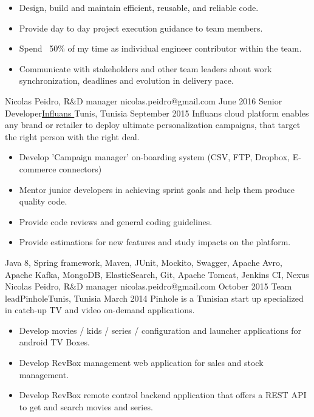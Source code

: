 \begin{experiences}
{\begin{itemize}
        \item Design, build and maintain efficient, reusable, and reliable code.
        \item Provide day to day project execution guidance to team members.
        \item Spend ~50\% of my time as individual engineer contributor within the team.
        \item Communicate with stakeholders and other team leaders about work synchronization, deadlines and evolution in delivery pace.
      \end{itemize}
    }
    {Nicolas Peidro, R\&D manager} {nicolas.peidro@gmail.com}
  \emptySeparator   
  \experienceWithReference
    {June 2016}       {Senior Developer}{\href{https://www.influans.com}{Influans \faExternalLink}}{Tunis, Tunisia}
    {September 2015}      {Influans cloud platform enables any brand or retailer to deploy ultimate personalization campaigns, that target the right person with the right deal.}
    {
      \begin{itemize}
        \item Develop 'Campaign manager' on-boarding system (CSV, FTP, Dropbox, E-commerce connectors)
        \item Mentor junior developers in achieving sprint goals and help them produce quality code.
        \item Provide code reviews and general coding guidelines.
        \item Provide estimations for new features and study impacts on the platform.
      \end{itemize}
    }
    {Java 8, Spring framework, Maven, JUnit, Mockito, Swagger, Apache Avro, Apache Kafka, MongoDB, ElasticSearch, Git, Apache Tomcat, Jenkins CI, Nexus}
    {Nicolas Peidro, R\&D manager} {nicolas.peidro@gmail.com}
  \emptySeparator  
  \experience
    {October 2015}   {Team lead}{Pinhole}{Tunis, Tunisia}
    {March 2014} {Pinhole is a Tunisian start up specialized in catch-up TV and video on-demand applications.}
                    {
                      \begin{itemize}
                        \item Develop movies / kids / series / configuration and launcher applications for android TV Boxes.
                        \item Develop RevBox management web application for sales and stock management.
                        \item Develop RevBox remote control backend application that offers a REST API to get and search movies and series.

\end{itemize}}
\end{experiences}
